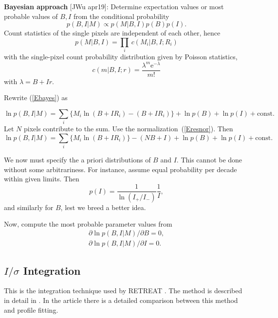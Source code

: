 \documentclass[twocolumn,preprintnumbers,amsmath,amssymb]{revtex4}
\begin{document}
\textbf{Bayesian approach} [JWu apr19]:
Determine expectation values or most probable values of $B,I$ from the conditional probability
\begin{equation}\label{Ebayes}
  p(B,I|M) \propto p(M|B,I) p(B) p(I).
\end{equation}
Count statistics of the single pixels are independent of each other, hence
\begin{equation}\label{Ec2p}
  p(M|B,I) = \prod_i\, c(M_i|B,I;R_i)
\end{equation}
with the single-pixel count probability distribution given by Poisson statistics,
\begin{equation}
  c(m|B,I;r) = \frac{\lambda^m{\mathrm e}^{-\lambda}}{m!}
\end{equation}
with $\lambda=B+Ir$.

Rewrite (\ref{Ebayes}) as
\begin{widetext}
\begin{equation}
  \ln p(B,I|M) = \sum_i\Big\{M_i\ln(B+IR_i)-(B+IR_i)\Big\} +\ln p(B) + \ln p(I) + \mathrm{const}.
\end{equation}
Let $N$ pixels contribute to the sum.
Use the normalization~(\ref{Eresnor}).
Then
\begin{equation}
  \ln p(B,I|M) = \sum_i\Big\{M_i\ln(B+IR_i)\Big\}-(NB+I) +\ln p(B) + \ln p(I) + \mathrm{const}.
\end{equation}
\end{widetext}
We now must specify the a priori distributions of $B$ and $I$.
This cannot be done without some arbitrariness.
For instance, assume equal probability per decade within given limits.
Then
\begin{equation}
  p(I) = \frac{1}{\ln(I_{+}/I_{-})} \frac{1}{I},
\end{equation}
and similarly for $B$, lest we breed a better idea.

Now, compute the most probable parameter values from
\begin{equation}
  \begin{array}{l}
  \partial \ln p(B,I|M) / \partial B = 0, \\[1.2ex]
  \partial \ln p(B,I|M) / \partial I = 0.
  \end{array}
\end{equation}

\subsection{$I/\sigma$ Integration}
This is the integration technique used by RETREAT \cite{StMc13}. The method is described in detail in \cite{WiKS88}.
In the article \cite{PrWM97} there is a detailed comparison between this method and profile fitting.
\end{document}
